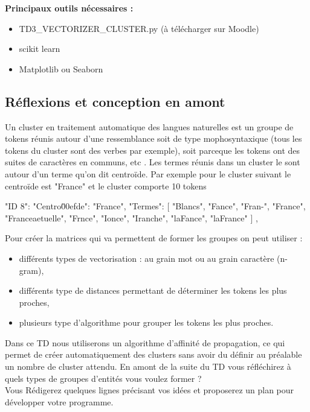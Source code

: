 \textbf{Principaux outils nécessaires :}
\begin{itemize}
\item TD3\_VECTORIZER\_CLUSTER.py (à télécharger sur Moodle)
  \item scikit learn
  \item Matplotlib ou Seaborn
  
\end{itemize}

\vspace{0.5cm}
\subsection{Réflexions et conception en amont}
\vspace{0.5cm}
\label{sec:amont}

Un cluster en traitement automatique des langues naturelles est un groupe de tokens réunis autour d'une ressemblance soit de type mophosyntaxique (tous les tokens du cluster sont des verbes par exemple), soit parceque les tokens ont des suites de caractères en communs, etc . Les termes réunis dans un cluster le sont autour d'un terme qu'on dit centroïde. 
Par exemple pour le cluster suivant le centroïde est "France" et le cluster comporte 10 tokens
\begin{python}
"ID 8": {
    "Centro\u00efde": "France",
    "Termes": [
      "Blancs",
      "Fance",
      "Fran-",
      "France",
      "Franceaetuelle",
      "Frnce",
      "Ionce",
      "Iranche",
      "laFance",
      "laFrance"
    ]
  },
  
\end{python}

Pour créer la matrices qui va permettent de former les groupes on peut utiliser :
\begin{itemize}
\item différents types de vectorisation : au grain mot ou au grain caractère (n-gram),
\item différents type de distances permettant de déterminer les tokens les plus proches,
\item plusieurs type d'algorithme pour grouper les tokens les plus proches.
\end{itemize}

Dans ce TD nous utiliserons un algorithme d'affinité de propagation, ce qui permet de créer automatiquement des clusters sans avoir du définir au préalable un nombre de cluster attendu. 
\newline
En amont de la suite du TD vous réfléchirez à quels types de groupes d'entités vous voulez former ?\\
Vous Rédigerez quelques lignes précisant vos idées et proposerez un plan pour développer votre programme.

